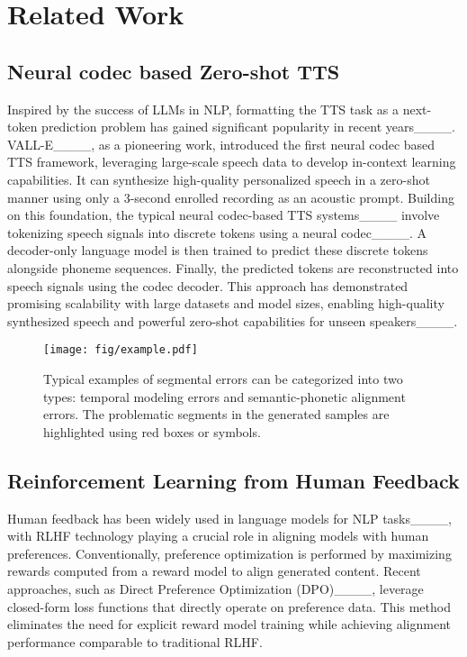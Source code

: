 \section{Related Work}
\subsection{Neural codec based Zero-shot TTS}
Inspired by the success of LLMs in NLP, formatting the TTS task as a next-token prediction problem has gained significant popularity in recent years____. VALL-E____, as a pioneering work, introduced the first neural codec based TTS framework, leveraging large-scale speech data to develop in-context learning capabilities. It can synthesize high-quality personalized speech in a zero-shot manner using only a 3-second enrolled recording as an acoustic prompt. Building on this foundation, the typical neural codec-based TTS systems____ involve tokenizing speech signals into discrete tokens using a neural codec____. A decoder-only language model is then trained to predict these discrete tokens alongside phoneme sequences. Finally, the predicted tokens are reconstructed into speech signals using the codec decoder. This approach has demonstrated promising scalability with large datasets and model sizes, enabling high-quality synthesized speech and powerful zero-shot capabilities for unseen speakers____.

\begin{figure*}[ht]
  \centering
  \texttt{[image: fig/example.pdf]}
  \caption{Typical examples of segmental errors can be categorized into two types: temporal modeling errors and semantic-phonetic alignment errors. The problematic segments in the generated samples are highlighted using red boxes or symbols.}
  \label{fig:example}
  \vspace{-15pt}
\end{figure*}

\subsection{Reinforcement Learning from Human Feedback}
Human feedback has been widely used in language models for NLP tasks____, with RLHF technology playing a crucial role in aligning models with human preferences. Conventionally, preference optimization is performed by maximizing rewards computed from a reward model to align generated content. Recent approaches, such as Direct Preference Optimization (DPO)____, leverage closed-form loss functions that directly operate on preference data. This method eliminates the need for explicit reward model training while achieving alignment performance comparable to traditional RLHF.

